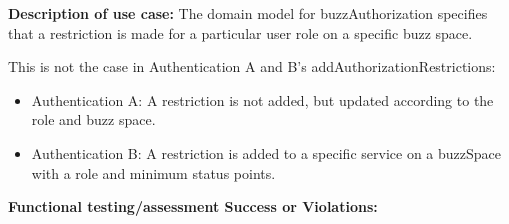 
\textbf{Description of use case:}\newline
The domain model for buzzAuthorization specifies that a restriction is made for a particular user role on a specific buzz space.
\medskip

\noindent
This is not the case in Authentication A and B's addAuthorizationRestrictions:
\begin{itemize}
\item Authentication A: A restriction is not added, but updated according to the role and buzz space. 
\item Authentication B: A restriction is  added to a specific service on a buzzSpace with a role and minimum status points.
\end{itemize}
\medskip

\noindent
\textbf{Functional testing/assessment Success or Violations:}
